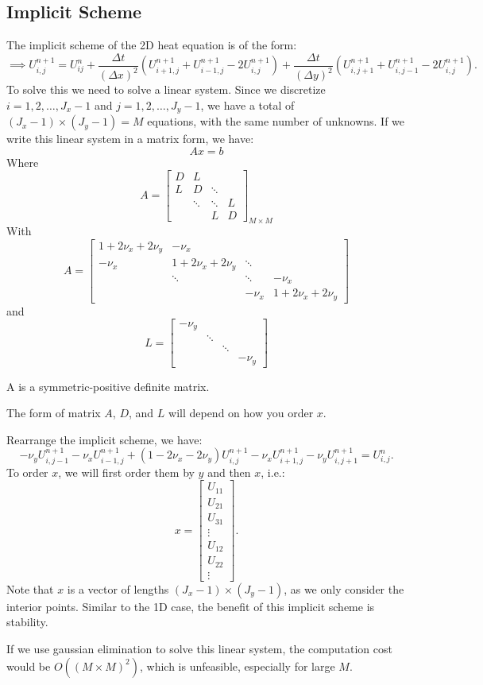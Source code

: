 \documentclass[../main/main.tex]{subfiles}
\begin{document}
\subsection{Implicit Scheme}
The implicit scheme of the 2D heat equation is of the form: \[ 
    \implies U_{i,j}^{n+1} = U_{ij}^n + \frac{\Delta t}{(\Delta x)^2} \left( U_{i+1,j}^{n+1} + U_{i-1,j}^{n+1} - 2U_{i,j}^{n+1} \right) +\frac{\Delta t}{(\Delta y)^2} \left( U_{i,j+1}^{n+1} + U_{i,j-1}^{n+1} - 2U_{i,j}^{n+1} \right)  
.\] To solve this we need to solve a linear system. Since we discretize $i = 1,2,\ldots,J_x-1$ and $j = 1,2,\ldots,J_y-1$, we have a total of $(J_x-1)\times (J_y-1) = M$ equations, with the same number of unknowns. If we write this linear system in a matrix form, we have: \[
Ax = b
\] Where \[
A = \begin{bmatrix} D &L & & \\ L & D &\ddots & \\ &\ddots &\ddots & L \\ & & L & D \end{bmatrix}_{M \times  M}
\] With \[
A = \begin{bmatrix} 1+2\nu_x + 2\nu_y &-\nu_x & & \\ -\nu_x &  1+2\nu_x + 2\nu_y &\ddots & \\ &\ddots &\ddots & -\nu_x \\ & & -\nu_x & 1+2\nu_x + 2\nu_y \end{bmatrix} 
\] and \[
L = \begin{bmatrix} -\nu_y & & & \\ & \ddots & & \\ & &\ddots &  \\ & & &-\nu_y \end{bmatrix} 
\] 
\begin{remark}
   A is a symmetric-positive definite matrix. 
\end{remark}
\begin{remark}
    The form of matrix $A$, $D$, and  $L$ will depend on how you order  $x$.
\end{remark}

Rearrange the implicit scheme, we have: \[
    -\nu_yU_{i,j-1}^{n+1} -\nu_x U_{i-1,j}^{n+1} + (1-2\nu_x -2\nu_y)U_{i,j}^{n+1} - \nu_x U_{i+1,j}^{n+1} - \nu_y U_{i,j+1}^{n+1} = U_{i,j}^{n}
.\] 
To order $x$, we will first order them by $y$ and then  $x$, i.e.:
\[
x = \begin{bmatrix} U_{11}\\ U_{21} \\ U_{31} \\ \vdots \\ U_{12}\\ U_{22} \\ \vdots \end{bmatrix} 
.\] 
Note that $x$ is a vector of lengths $(J_x-1)\times (J_y-1)$, as we only consider the interior points.  
Similar to the 1D case, the benefit of this implicit scheme is stability.

\begin{remark}
    If we use gaussian elimination to solve this linear system, the computation cost would be $O((M \times  M)^2)$, which is unfeasible, especially for large $M$. 
\end{remark}
\end{document}
